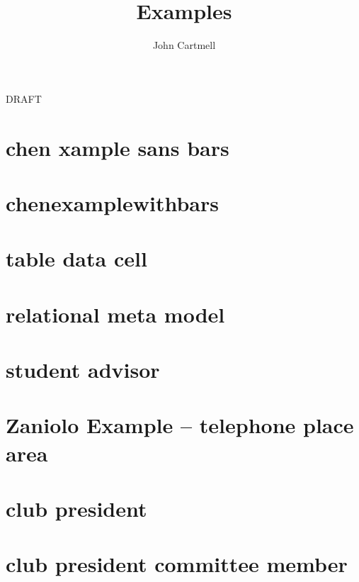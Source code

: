 \documentclass[10pt,a4paper]{article}
\begin{document}
\title{Examples}


\author{John Cartmell}

\maketitle
\begin{center}
DRAFT
\end{center}

\section{chen xample sans bars}


\section{chenexamplewithbars}


\section{table data cell}


\section{relational meta model}


\section{student advisor}


\section{Zaniolo Example -- telephone place area}


\section{club president}


\section{club president committee member}

\end{document}
